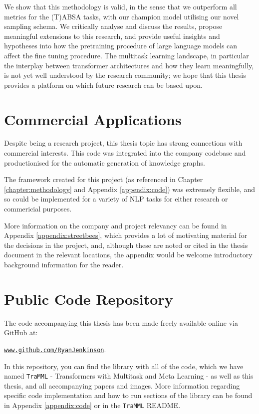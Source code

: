 We show that this methodology is valid, in the sense that we outperform all metrics for the (T)ABSA tasks, with our champion model utilising our novel sampling schema. We critically analyse and discuss the results, propose meaningful extensions to this research, and provide useful insights and hypotheses into how the pretraining procedure of large language models can affect the fine tuning procedure. The multitask learning landscape, in particular the interplay between transformer architectures and how they learn meaningfully, is not yet well understood by the research community; we hope that this thesis provides a platform on which future research can be based upon.

\section{Commercial Applications}
Despite being a research project, this thesis topic has strong connections with commercial interests. This code was integrated into the company codebase and productionised for the automatic generation of knowledge graphs.

The framework created for this project (as referenced in Chapter \ref{chapter:methodology} and Appendix \ref{appendix:code}) was extremely flexible, and so could be implemented for a variety of NLP tasks for either research or commericial purposes.

More information on the company and project relevancy can be found in Appendix \ref{appendix:streetbees}, which provides a lot of motivating material for the decisions in the project, and, although these are noted or cited in the thesis document in the relevant locations, the appendix would be welcome introductory background information for the reader.

\section{Public Code Repository}
\label{section:intro:code}
The code accompanying this thesis has been made freely available online via GitHub at:
 \begin{center}
 \href{www.github.com/RyanJenkinson}{\texttt{www.github.com/RyanJenkinson}}.
 \end{center}
In this repository, you can find the library with all of the code, which we have named \texttt{TraMML} - Transformers with Multitask and Meta Learning - as well as this thesis, and all accompanying papers and images. More information regarding specific code implementation and how to run sections of the library can be found in Appendix \ref{appendix:code} or in the \texttt{TraMML} README.


